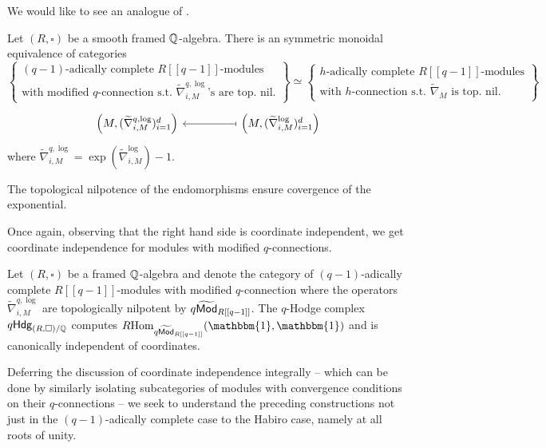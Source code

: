 We would like to see an analogue of . 
\begin{proposition}\label{prop: R-modules with modified connection}
    Let $(R,\square)$ be a smooth framed $\mathbb{Q}$-algebra. There is an symmetric monoidal equivalence of categories 
    $$\left\{\substack{(q-1)\text{-adically complete }R[[q-1]]\text{-modules} \\ \text{with modified }q\text{-connection s.t. }\widetilde{\nabla}^{q,\log}_{i,M}\text{'s are top. nil.}}\right\}\simeq\left\{\substack{h\text{-adically complete }R[[q-1]]\text{-modules} \\ \text{with }h\text{-connection s.t. }\widetilde{\nabla}_{M}\text{ is top. nil.}}\right\}$$
    $$%
    \begin{tikzcd}
        {\left(M,(\widetilde{\nabla}^{q,\log}_{i,M})_{i=1}^{d}\right)} && {\left(M,(\widetilde{\nabla}_{i,M}^{\log})_{i=1}^{d}\right)}
        \arrow[maps to, from=1-3, to=1-1]
    \end{tikzcd}$$
    where $\widetilde{\nabla}^{q,\log}_{i,M}=\exp(\widetilde{\nabla}^{\log}_{i,M})-1$. 
\end{proposition}
\begin{remark}
    The topological nilpotence of the endomorphisms ensure covergence of the exponential. 
\end{remark}
Once again, observing that the right hand side is coordinate independent, we get coordinate independence for modules with modified $q$-connections. 
\begin{corollary}\label{corr: modules with modified q-connection are coordinate independent}
    Let $(R,\square)$ be a framed $\mathbb{Q}$-algebra and denote the category of $(q-1)$-adically complete $R[[q-1]]$-modules with modified $q$-connection where the operators $\widetilde{\nabla}_{i,M}^{q,\log}$ are topologically nilpotent by $q\widetilde{\mathsf{Mod}}_{R[[q-1]]}$. The $q$-Hodge complex $q\mathsf{Hdg}_{(R,\square)/\mathbb{Q}}$ computes $R\Hom_{q\widetilde{\Mod}_{R[[q-1]]}}(\mathbbm{1},\mathbbm{1})$ and is canonically independent of coordinates. 
\end{corollary}
Deferring the discussion of coordinate independence integrally -- which can be done by similarly isolating subcategories of modules with convergence conditions on their $q$-connections -- we seek to understand the preceding constructions not just in the $(q-1)$-adically complete case to the Habiro case, namely at all roots of unity. 

